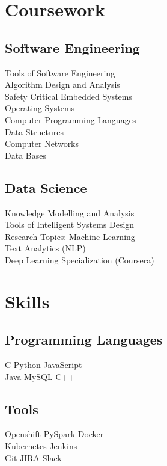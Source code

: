 \documentclass[]{deedy-resume-openfont}
\begin{document}
\begin{minipage}[t]{0.33\textwidth}

\section{Coursework}
\subsection{Software Engineering}
Tools of Software Engineering \\
Algorithm Design and Analysis\\
Safety Critical Embedded Systems \\
Operating Systems \\
Computer Programming Languages \\
Data Structures \\
Computer Networks \\
Data Bases \\
\sectionsep

\subsection{Data Science}
Knowledge Modelling and Analysis \\
Tools of Intelligent Systems Design \\
Research Topics: Machine Learning \\
Text Analytics (NLP) \\
Deep Learning Specialization (Coursera)
\sectionsep


\section{Skills}
\subsection{Programming Languages}
\textbullet{} C \textbullet{} Python \textbullet{} JavaScript \\

\textbullet{} Java \textbullet{} MySQL \textbullet{} C++
\sectionsep
\subsection{Tools}
\textbullet{} Openshift \textbullet{} PySpark \textbullet{}  Docker \\
\textbullet{} Kubernetes \textbullet{} Jenkins \\
 \textbullet{} Git \textbullet{} JIRA \textbullet{} Slack 


\end{minipage}
\end{document}
